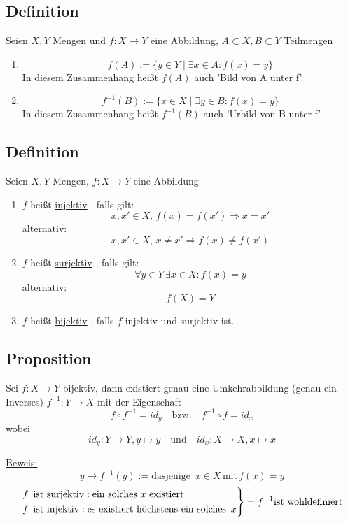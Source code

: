 \subsection{Definition}
Seien \(X,Y\) Mengen und \( f : X \rightarrow Y \) eine Abbildung, \( A \subset X, B \subset Y \) Teilmengen

\begin{enumerate}
\item \[ f(A) := \{ y \in Y \mid \exists x \in A : f(x)=y \} \]
In diesem Zusammenhang heißt \( f(A) \) auch 'Bild von A unter f'.
\item \[ f^{-1}(B) := \{ x \in X \mid \exists y \in B : f(x)=y \} \]
In diesem Zusammenhang heißt \(f^{-1} (B) \) auch 'Urbild von B unter f'.
\end{enumerate}

\subsection{Definition} Seien \(X,Y\) Mengen, \(f : X \rightarrow Y \) eine Abbildung
\begin{enumerate}
\item \( f \) heißt \underline{injektiv} , falls gilt:
\[ x,x' \in X , \, f(x)=f(x') \Longrightarrow x=x'\]
alternativ: \[ x,x' \in X , \, x \not= x' \Longrightarrow f(x) \not= f(x') \]
\item \( f\) heißt \underline{surjektiv} , falls gilt:
\[ \forall y \in Y \, \exists x \in X : f(x)=y \]
alternativ: \[  f(X)=Y \]
\item \( f \) heißt \underline{bijektiv} , falls \( f \) injektiv und surjektiv ist.
\end{enumerate}

\subsection{Proposition}
Sei \( f : X \rightarrow Y \) bijektiv, dann existiert genau eine Umkehrabbildung (genau ein Inverses) \( f^{-1} : Y \rightarrow X \) mit der Eigenschaft 
\[  f \circ f^{-1} = id_y  \quad  \text{bzw.} \quad f^{-1} \circ f = id_x \]
wobei 
\[  id_y : Y \rightarrow Y , y \mapsto y \quad  \text{und} \quad id_x : X \rightarrow X, x \mapsto x\]

\underline{Beweis:} \[ y \mapsto f^{-1}(y) := \text{dasjenige} \enspace x \in X \, \text{mit} \, f(x)=y \]
\[ 
\begin{rcases} 
f \enspace \text{ist surjektiv} : \text{ein solches \( x \) existiert} \\ 
f \enspace \text{ist injektiv} : \text{es existiert höchstens ein solches} \enspace x 
\end{rcases}
= f^{-1} \text{ist wohldefiniert}
\]

